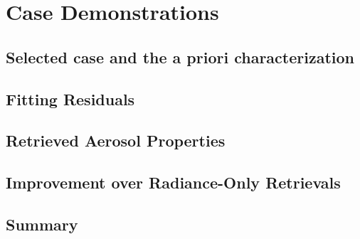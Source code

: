 \chapter{Case Demonstrations}

\section{Selected case and the a priori characterization}

\section{Fitting Residuals}

\section{Retrieved Aerosol Properties}

\section{Improvement over Radiance-Only Retrievals}

\section{Summary}
